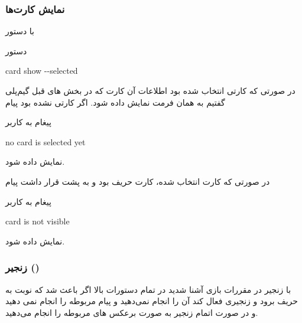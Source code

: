 \documentclass[]{article}
\begin{document}
\subsubsection*{{\titr نمایش کارت‌ها}}
با دستور 
\begin{mybox}[colback=yellow]{دستور}
	\begin{latin}	
		card show -{}-selected
	\end{latin}
\end{mybox}
در صورتی که کارتی انتخاب شده بود اطلاعات آن کارت که در بخش  های قبل گیم‌پلی گفتیم به همان فرمت نمایش داده شود.   اگر کارتی  نشده 
    بود پیام
\begin{mybox}[colback=yellow]{پیغام به کاربر}
	\begin{latin}	
		no card is selected yet
	\end{latin}
\end{mybox}
نمایش داده شود.

در صورتی که کارت انتخاب شده، کارت حریف بود و به پشت قرار داشت پیام
 
 
 \begin{mybox}[colback=yellow]{پیغام به کاربر}
 	\begin{latin}	
 	card is not visible
 	\end{latin}
 \end{mybox}
نمایش داده شود.
\\


\subsubsection*{{\titr زنجیر ()}}
با زنجیر در مقررات بازی آشنا شدید در تمام دستورات بالا اگر باعث شد که نوبت 
به حریف برود و زنجیری فعال کند آن  را انجام نمی‌دهید و پیام 
مربوطه 
را انجام نمی دهید و در صورت اتمام زنجیر به صورت برعکس  های 
مربوطه 
را انجام می‌دهید.
\end{document}
